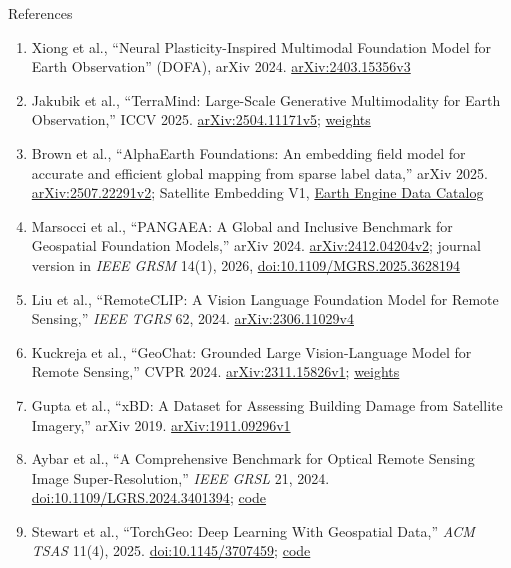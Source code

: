 \begin{frame}[allowframebreaks=0.9]{References}
\begin{enumerate}
    \item Xiong et al., ``Neural Plasticity-Inspired Multimodal Foundation Model for Earth Observation'' (DOFA), arXiv 2024. \href{https://arxiv.org/abs/2403.15356v3}{arXiv:2403.15356v3}
    \item Jakubik et al., ``TerraMind: Large-Scale Generative Multimodality for Earth Observation,'' ICCV 2025. \href{https://arxiv.org/abs/2504.11171v5}{arXiv:2504.11171v5}; \href{https://huggingface.co/ibm-esa-geospatial/TerraMind-1.0-base}{weights}
    \item Brown et al., ``AlphaEarth Foundations: An embedding field model for accurate and efficient global mapping from sparse label data,'' arXiv 2025. \href{https://arxiv.org/abs/2507.22291v2}{arXiv:2507.22291v2}; Satellite Embedding V1, \href{https://developers.google.com/earth-engine/datasets/catalog/GOOGLE_SATELLITE_EMBEDDING_V1_ANNUAL}{Earth Engine Data Catalog}
    \item Marsocci et al., ``PANGAEA: A Global and Inclusive Benchmark for Geospatial Foundation Models,'' arXiv 2024. \href{https://arxiv.org/abs/2412.04204v2}{arXiv:2412.04204v2}; journal version in \textit{IEEE GRSM} 14(1), 2026, \href{https://doi.org/10.1109/MGRS.2025.3628194}{doi:10.1109/MGRS.2025.3628194}
    \item Liu et al., ``RemoteCLIP: A Vision Language Foundation Model for Remote Sensing,'' \textit{IEEE TGRS} 62, 2024. \href{https://arxiv.org/abs/2306.11029v4}{arXiv:2306.11029v4}
    \item Kuckreja et al., ``GeoChat: Grounded Large Vision-Language Model for Remote Sensing,'' CVPR 2024. \href{https://arxiv.org/abs/2311.15826v1}{arXiv:2311.15826v1}; \href{https://huggingface.co/MBZUAI/geochat-7B}{weights}
    \item Gupta et al., ``xBD: A Dataset for Assessing Building Damage from Satellite Imagery,'' arXiv 2019. \href{https://arxiv.org/abs/1911.09296v1}{arXiv:1911.09296v1}
    \item Aybar et al., ``A Comprehensive Benchmark for Optical Remote Sensing Image Super-Resolution,'' \textit{IEEE GRSL} 21, 2024. \href{https://doi.org/10.1109/LGRS.2024.3401394}{doi:10.1109/LGRS.2024.3401394}; \href{https://github.com/ESAOpenSR/opensr-test/tree/9e95aeb56a2d6315e8e1c40df6f0aac6dbb09c75}{code}
    \item Stewart et al., ``TorchGeo: Deep Learning With Geospatial Data,'' \textit{ACM TSAS} 11(4), 2025. \href{https://doi.org/10.1145/3707459}{doi:10.1145/3707459}; \href{https://github.com/torchgeo/torchgeo}{code}

\end{enumerate}
\end{frame}
